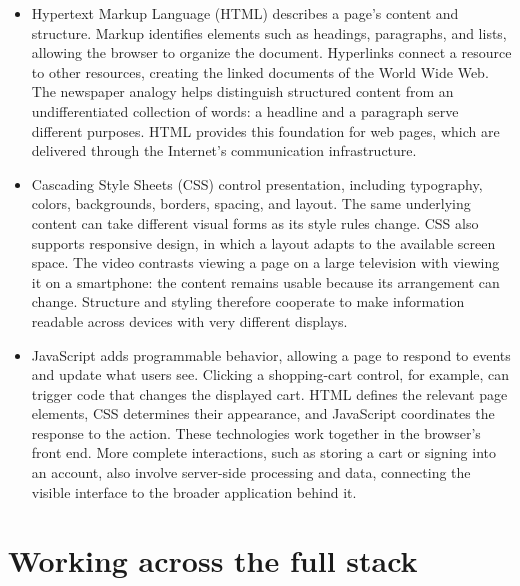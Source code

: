 \documentclass[10pt]{article}
\begin{document}
\begin{itemize}[leftmargin=1.25em, itemsep=0.3em, parsep=0pt, topsep=0pt]
    \item Hypertext Markup Language (HTML) describes a page's content and structure. Markup identifies elements such as headings, paragraphs, and lists, allowing the browser to organize the document. Hyperlinks connect a resource to other resources, creating the linked documents of the World Wide Web. The newspaper analogy helps distinguish structured content from an undifferentiated collection of words: a headline and a paragraph serve different purposes. HTML provides this foundation for web pages, which are delivered through the Internet's communication infrastructure.

    \item Cascading Style Sheets (CSS) control presentation, including typography, colors, backgrounds, borders, spacing, and layout. The same underlying content can take different visual forms as its style rules change. CSS also supports responsive design, in which a layout adapts to the available screen space. The video contrasts viewing a page on a large television with viewing it on a smartphone: the content remains usable because its arrangement can change. Structure and styling therefore cooperate to make information readable across devices with very different displays.

    \item JavaScript adds programmable behavior, allowing a page to respond to events and update what users see. Clicking a shopping-cart control, for example, can trigger code that changes the displayed cart. HTML defines the relevant page elements, CSS determines their appearance, and JavaScript coordinates the response to the action. These technologies work together in the browser's front end. More complete interactions, such as storing a cart or signing into an account, also involve server-side processing and data, connecting the visible interface to the broader application behind it.
\end{itemize}

\newpage
\section*{Working across the full stack}
\end{document}
